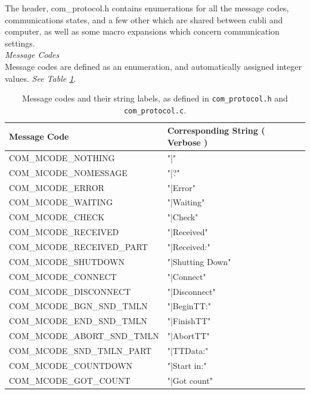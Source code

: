 The header, com\_protocol.h contains enumerations for all the message codes, communications states, and a few other which are shared between cubli and computer, as well as some macro expansions which concern communication settings.\\

\textit{Message Codes}\\

Message codes are defined as an enumeration, and automatically assigned integer values. \textit{See Table \ref{tab:mcodes}}.

\begin{table}[ht]
\begin{center}
\caption{Message codes and their string labels, as defined in \texttt{com\_protocol.h} and \texttt{com\_protocol.c}.}\vspace{1ex}
\label{tab:mcodes}
\begin{tabular}{ll}\hline
Message Code & Corresponding String ( Verbose ) \\ \hline 
COM\_MCODE\_NOTHING             & "|"                  \\
COM\_MCODE\_NOMESSAGE           & "|?"                 \\
COM\_MCODE\_ERROR               & "|Error"             \\
COM\_MCODE\_WAITING             & "|Waiting"           \\
COM\_MCODE\_CHECK               & "|Check"             \\
COM\_MCODE\_RECEIVED            & "|Received"          \\
COM\_MCODE\_RECEIVED\_PART      & "|Received:"         \\
COM\_MCODE\_SHUTDOWN            & "|Shutting Down"     \\
COM\_MCODE\_CONNECT             & "|Connect"           \\
COM\_MCODE\_DISCONNECT          & "|Disconnect"        \\
COM\_MCODE\_BGN\_SND\_TMLN      & "|BeginTT:"          \\
COM\_MCODE\_END\_SND\_TMLN      & "|FinishTT"          \\
COM\_MCODE\_ABORT\_SND\_TMLN    & "|AbortTT"           \\
COM\_MCODE\_SND\_TMLN\_PART     & "|TTData:"           \\
COM\_MCODE\_COUNTDOWN           & "|Start in:"         \\
COM\_MCODE\_GOT\_COUNT          & "|Got count"         \\

\end{tabular}
\end{center}
\end{table}
